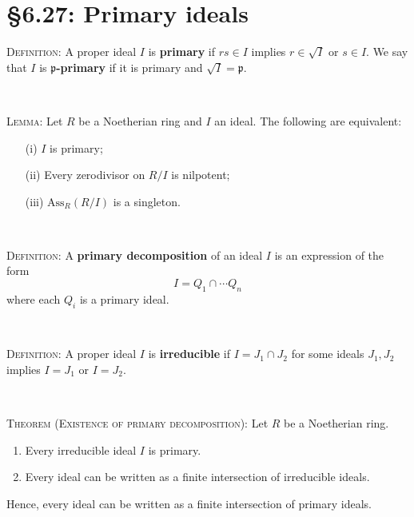 \documentclass[12pt]{amsart}
\newcommand{\p}{\mathfrak{p}}
\newcommand{\Ass}{\mathrm{Ass}}
\renewcommand{\1}{\mathbbm{1}}
\newcommand{\showsol}[1]{\def\displaysol{#1}}
\begin{document}
\showsol{0}
	
	\thispagestyle{empty}
	
	\section*{\S6.27: Primary ideals}
	
	\begin{framed}

\noindent \textsc{Definition:} A proper ideal $I$ is \textbf{primary} if $rs\in I$ implies $r\in \sqrt{I}$ or $s\in I$. We say that $I$ is \textbf{$\p$-primary} if it is primary and $\sqrt{I}=\p$.

\

\noindent \textsc{Lemma:} Let $R$ be a Noetherian ring and $I$ an ideal. The following are equivalent:
\begin{enumerate}
\item[(i)] $I$ is primary;
\item[(ii)] Every zerodivisor on $R/I$ is nilpotent;
\item[(iii)] $\Ass_R(R/I)$ is a singleton.
\end{enumerate}

\


\noindent \textsc{Definition:} A \textbf{primary decomposition} of an ideal $I$ is an expression of the form
\[ I = Q_1 \cap \cdots Q_n\]
where each $Q_i$ is a primary ideal.

\


\noindent \textsc{Definition:} A proper ideal $I$ is \textbf{irreducible} if $I=J_1\cap J_2$ for some ideals $J_1,J_2$ implies $I=J_1$ or $I=J_2$.


\


\noindent \textsc{Theorem (Existence of primary decomposition):} Let $R$ be a Noetherian ring.
\begin{enumerate}
\item Every irreducible ideal $I$ is primary.
\item Every ideal can be written as a finite intersection of irreducible ideals.
\end{enumerate}
Hence, every ideal can be written as a finite intersection of primary ideals.
\end{framed}
\end{document}
